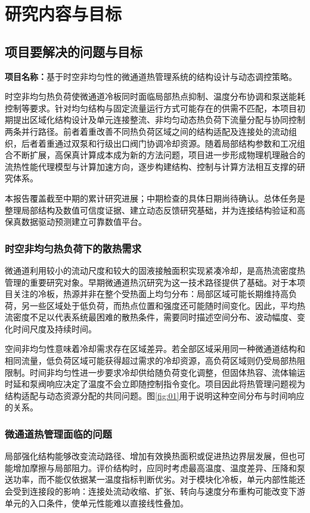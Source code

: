\documentclass[UTF8]{midterm}
\begin{document}
\makecover
\section{研究内容与目标}

\subsection{项目要解决的问题与目标}

\textbf{项目名称：}基于时空非均匀性的微通道热管理系统的结构设计与动态调控策略。

时空非均匀热负荷使微通道冷板同时面临局部热点抑制、温度分布协调和泵送能耗控制等要求。针对均匀结构与固定流量运行方式可能存在的供需不匹配，本项目初期提出区域化结构设计及单元连接整流、非均匀动态热负荷下流量分配与协同控制两条并行路径。前者着重改善不同热负荷区域之间的结构适配及连接处的流动组织，后者着重通过双泵和行级出口阀门协调冷却资源。随着局部结构参数和工况组合不断扩展，高保真计算成本成为新的方法问题，项目进一步形成物理机理融合的流热性能代理模型与计算加速方向，逐步构建结构、控制与计算方法相互支撑的研究体系。

本报告覆盖截至中期的累计研究进展；中期检查的具体日期尚待确认。总体任务是整理局部结构及数值可信度证据、建立动态反馈研究基础，并为连接结构验证和高保真数据驱动预测建立可靠数值平台。

\subsubsection{时空非均匀热负荷下的散热需求}
微通道利用较小的流动尺度和较大的固液接触面积实现紧凑冷却，是高热流密度热管理的重要研究对象。早期微通道热沉研究为这一技术路径提供了基础\cite{tuckerman1981}。对于本项目关注的冷板，热源并非在整个受热面上均匀分布：局部区域可能长期维持高负荷，另一些区域处于低负荷，而热点位置和强度还可能随时间变化。因此，平均热流密度不足以代表系统最困难的散热条件，需要同时描述空间分布、波动幅度、变化时间尺度及持续时间。

空间非均匀性意味着冷却需求存在区域差异。若全部区域采用同一种微通道结构和相同流量，低负荷区域可能获得超过需求的冷却资源，高负荷区域则仍受局部热阻限制。时间非均匀性进一步要求冷却供给随负荷变化调整，但固体热容、流体输运时延和泵阀响应决定了温度不会立即随控制指令变化。项目因此将热管理问题视为结构适配与动态资源分配的共同问题。图\ref{fig:01}用于说明这种空间分布与时间响应的关系。

\subsubsection{微通道热管理面临的问题}
局部强化结构能够改变流动路径、增加有效换热面积或促进热边界层发展，但也可能增加摩擦与局部阻力。评价结构时，应同时考虑最高温度、温度差异、压降和泵送功率，而不能仅依据某一温度指标判断优劣。对于模块化冷板，单元内部性能还会受到连接段的影响：连接处流动收缩、扩张、转向与速度分布重构可能改变下游单元的入口条件，使单元性能难以直接线性叠加。
\end{document}
